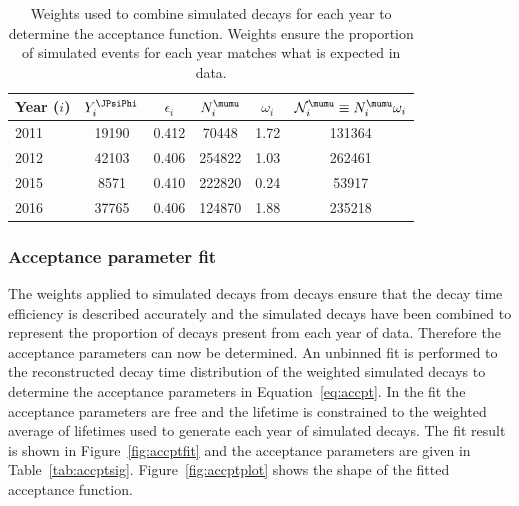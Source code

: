 \begin{table}[tb]
\begin{center}
\begin{tabular}{lccccc}
\toprule \toprule
Year ($i$) & $Y_i^{\JPsiPhi}$ & $\epsilon_i$ & $N^{\mumu}_i$ & $\omega_i$ & $\mathcal{N}^{\mumu}_i \equiv N^{\mumu}_i \omega_i$ \\ \midrule 
2011       & 19190           & 0.412        & 70448        & 1.72       & 131364 \\
2012       & 42103           & 0.406        & 254822       & 1.03       & 262461 \\
2015       & 8571            & 0.410        & 222820       & 0.24       & 53917 \\ 
2016       & 37765           & 0.406        & 124870       & 1.88       & 235218 \\ \bottomrule \bottomrule
\end{tabular}
\vspace{0.7cm}                                                                                                                                               
\caption{Weights used to combine simulated \bsmumu decays for each year to determine the acceptance function. Weights ensure the proportion of simulated events for each year matches what is expected in data.}
\label{tab:MCWeightInfo}
\end{center}
\vspace{-1.0cm}                                                                                                                                               
\end{table}


\subsubsection*{Acceptance parameter fit}

The weights applied to \bsmumu simulated decays from \bdkpi decays ensure that the decay time efficiency is described accurately and the simulated decays have been combined to represent the proportion of decays present from each year of data. Therefore the acceptance parameters can now be determined.  
An unbinned \ml fit is performed to the reconstructed decay time distribution of the weighted simulated \bsmumu decays to determine the acceptance parameters in Equation~\ref{eq:accpt}. In the fit the acceptance parameters are free and the \bsmumu lifetime is constrained to the weighted average of lifetimes used to generate each year of simulated decays. The fit result is shown in Figure~\ref{fig:accptfit} and the acceptance parameters are given in Table~\ref{tab:accptsig}. Figure~\ref{fig:accptplot} shows the shape of the fitted acceptance function. %




